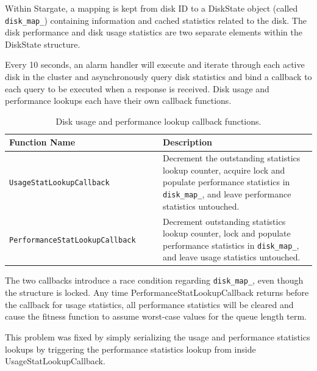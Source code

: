 \documentclass[12pt]{article}
\begin{document}
\begin{appendices}
  Within Stargate, a mapping is kept from disk ID to a DiskState object (called
  \texttt{disk\_map\_}) containing information and cached statistics related to
  the disk. The disk performance and disk usage statistics are two separate
  elements within the DiskState structure.

  Every 10 seconds, an alarm handler will execute and iterate through each
  active disk in the cluster and asynchronously query disk statistics and bind a
  callback to each query to be executed when a response is received. Disk usage
  and performance lookups each have their own callback functions.

  \begin{table}[htbp]
    \caption{Disk usage and performance lookup callback functions.}
    \begin{center}
    \begin{tabular}{ | p{0.5\linewidth} | p{0.5\linewidth} | }
      \hline
      \textbf{Function Name} & \textbf{Description} \\ \hline
      \verb|UsageStatLookupCallback| & Decrement the outstanding statistics lookup
                                       counter, acquire lock and populate
                                       performance statistics in
                                       \texttt{disk\_map\_}, and leave
                                       performance statistics untouched.
                                       \\ \hline

      \verb|PerformanceStatLookupCallback| & Decrement outstanding statistics 
                                             lookup counter, lock and
                                             populate performance statistics in
                                             \texttt{disk\_map\_}, and leave
                                             usage statistics untouched. \\ \hline

      \hline
    \end{tabular}
    \end{center}
  \end{table}

  The two callbacks introduce a race condition regarding \texttt{disk\_map\_},
  even though the structure is locked. Any time PerformanceStatLookupCallback
  returns before the callback for usage statistics, all performance statistics
  will be cleared and cause the fitness function to assume worst-case values
  for the queue length term.

  This problem was fixed by simply serializing the usage and performance
  statistics lookups by triggering the performance statistics lookup from
  inside UsageStatLookupCallback.

\end{appendices}
\end{document}
